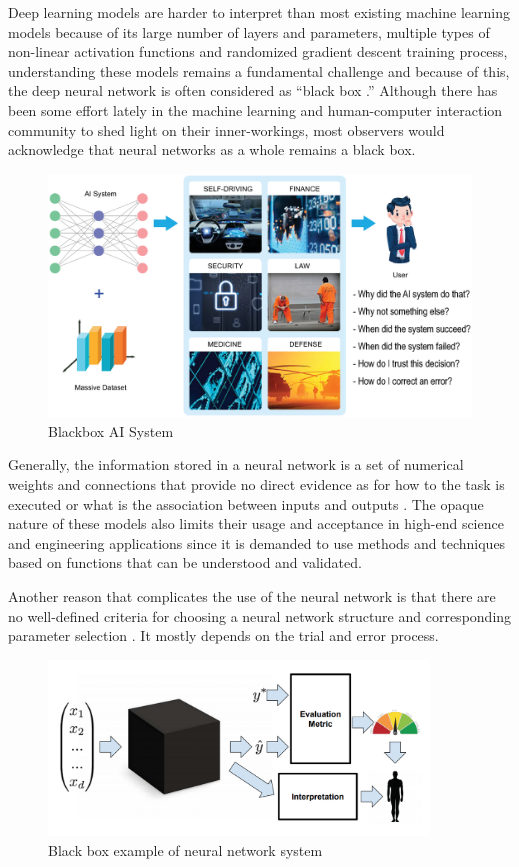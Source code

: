 Deep learning models are harder to interpret than most existing machine learning models \cite{Kahng2018} because of its large number of layers and parameters, multiple types of non-linear activation functions and randomized gradient descent training process, understanding these models remains a fundamental challenge and because of this, the deep neural network is often considered as “black box \cite{dlvwz}.” Although there has been some effort lately in the machine learning and human-computer interaction community to shed light on their inner-workings, most observers would acknowledge that neural networks as a whole remains a black box.

\begin{figure}[htbp]
\centering
\includegraphics[width=1\textwidth]{images/Blackbox-AI-copy.eps}
\caption{Blackbox AI System}
\label{fig:Blackbox AI system}
\end{figure}

Generally, the information stored in a neural network is a set of numerical weights and connections that provide no direct evidence as for how to the task is executed or what is the association between inputs and outputs \cite{Tzeng2005}. The opaque nature of these models also limits their usage and acceptance in high-end science and engineering applications since it is demanded to use methods and techniques based on functions that can be understood and validated.

Another reason that complicates the use of the neural network is that there are no well-defined criteria for choosing a neural network structure and corresponding parameter selection \cite{dlvwz}. It mostly depends on the trial and error process.

\begin{figure}[htbp]
\centering
\includegraphics[width=0.90\textwidth]{images/Black-box.png}
\caption{Black box example of neural network system}
\label{fig:blackbox}
\end{figure}

